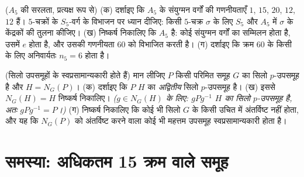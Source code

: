 \begin{exercise}[$\star\star\star$]\label{exo:b3:groups:11}
($A_5$ की सरलता, प्रत्यक्ष रूप से)
(क) दर्शाइए कि $A_5$ के संयुग्मन वर्गों की गणनीयताएँ $1$,
$15$, $20$, $12$, $12$ हैं। $5$-चक्रों के $S_5$-वर्ग के
विभाजन पर ध्यान दीजिए: किसी $5$-चक्र $\sigma$ के लिए $S_5$ और
$A_5$ में $\sigma$ के केंद्रकों की तुलना कीजिए।
(ख) निष्कर्ष निकालिए कि $A_5$  है: कोई 
संयुग्मन वर्गों का सम्मिलन होता है, उसमें $e$ होता है, और
उसकी गणनीयता $60$ को विभाजित करती है।
(ग) दर्शाइए कि क्रम $60$ के किसी  के लिए अनिवार्यतः
$n_5 =
6$ होता है।
\end{exercise}

\begin{exercise}[$\star\star$]\label{exo:b3:groups:12}
(सिलो उपसमूहों के  स्वप्रसामान्यकारी होते हैं) मान
लीजिए $P$ किसी परिमित समूह $G$ का सिलो $p$-उपसमूह है और
$H =
N_G(P)$।
(क) दर्शाइए कि $P$ $H$ का \emph{अद्वितीय} सिलो
$p$-उपसमूह है।
(ख) इससे $N_G(H) = H$ निष्कर्ष निकालिए। \emph{($g \in N_G(H)$ के लिए: $gPg^{-1}$
$H$ का सिलो $p$-उपसमूह है, अतः $gPg^{-1} = P$।)}
(ग) निष्कर्ष निकालिए कि कोई भी सिलो  $G$ के किसी
उचित  में अंतर्विष्ट नहीं होता, और यह कि $N_G(P)$
को अंतर्विष्ट करने वाला कोई भी महत्तम उपसमूह स्वप्रसामान्यकारी
होता है।
\end{exercise}

\section{समस्या: अधिकतम 15 क्रम वाले समूह}

